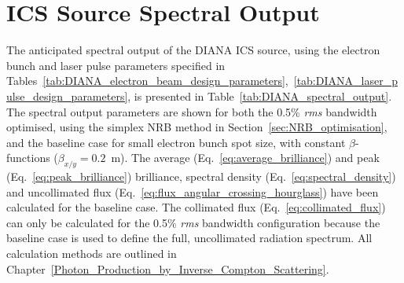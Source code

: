 \documentclass[../main.tex]{subfiles}
\begin{document}
\section{ICS Source Spectral Output}
\label{sec:DIANA_spectral_output}

The anticipated spectral output of the DIANA ICS source, using the electron bunch and laser pulse parameters specified in Tables~\ref{tab:DIANA_electron_beam_design_parameters},~\ref{tab:DIANA_laser_pulse_design_parameters}, is presented in Table~\ref{tab:DIANA_spectral_output}. The spectral output parameters are shown for both the 0.5\% \textit{rms} bandwidth optimised, using the simplex NRB method in Section~\ref{sec:NRB_optimisation}, and the baseline case for small electron bunch spot size, with constant $\beta$-functions ($\beta_{x/y}=0.2$~\si{\meter}). The average (Eq.~\ref{eq:average_brilliance}) and peak (Eq.~\ref{eq:peak_brilliance}) brilliance, spectral density (Eq.~\ref{eq:spectral_density}) and uncollimated flux (Eq.~\ref{eq:flux_angular_crossing_hourglass}) have been calculated for the baseline case. The collimated flux (Eq.~\ref{eq:collimated_flux}) can only be calculated for the 0.5\% \textit{rms} bandwidth configuration because the baseline case is used to define the full, uncollimated radiation spectrum. All calculation methods are outlined in Chapter~\ref{Photon_Production_by_Inverse_Compton_Scattering}. 
\end{document}
